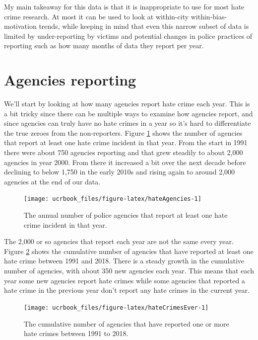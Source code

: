 \documentclass[
  12pt,
  openany]{book}
\begin{document}
My main takeaway for this data is that it is inappropriate to use for most hate crime research. At most it can be used to look at within-city within-bias-motivation trends, while keeping in mind that even this narrow subset of data is limited by under-reporting by victims and potential changes in police practices of reporting such as how many months of data they report per year.

\hypertarget{agencies-reporting-6}{%
\section{Agencies reporting}\label{agencies-reporting-6}}

We'll start by looking at how many agencies report hate crime each year. This is a bit tricky since there can be multiple ways to examine how agencies report, and since agencies can truly have no hate crimes in a year so it's hard to differentiate the true zeroes from the non-reporters. Figure \ref{fig:hateAgencies} shows the number of agencies that report at least one hate crime incident in that year. From the start in 1991 there were about 750 agencies reporting and that grew steadily to about 2,000 agencies in year 2000. From there it increased a bit over the next decade before declining to below 1,750 in the early 2010s and rising again to around 2,000 agencies at the end of our data.

\begin{figure}

{\centering \texttt{[image: ucrbook\_files/figure-latex/hateAgencies-1]} 

}

\caption{The annual number of police agencies that report at least one hate crime incident in that year.}\label{fig:hateAgencies}
\end{figure}

The 2,000 or so agencies that report each year are not the same every year. Figure \ref{fig:hateCrimesEver} shows the cumulative number of agencies that have reported at least one hate crime between 1991 and 2018. There is a steady growth in the cumulative number of agencies, with about 350 new agencies each year. This means that each year some new agencies report hate crimes while some agencies that reported a hate crime in the previous year don't report any hate crimes in the current year.

\begin{figure}

{\centering \texttt{[image: ucrbook\_files/figure-latex/hateCrimesEver-1]} 

}

\caption{The cumulative number of agencies that have reported one or more hate crimes between 1991 to 2018.}\label{fig:hateCrimesEver}
\end{figure}
\end{document}
